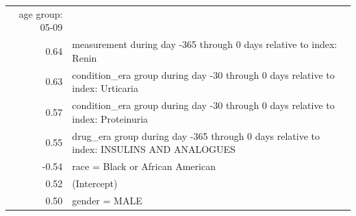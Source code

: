 \documentclass[10.5pt]{book}
\theoremstyle{definition}
\theoremstyle{definition}
\theoremstyle{definition}
\theoremstyle{remark}
\begin{document}
\begin{longtable}[]{@{}rl@{}}
\begin{minipage}[t]{0.87\columnwidth}
age group: 05-09\strut
\end{minipage}\tabularnewline
\begin{minipage}[t]{0.07\columnwidth}\raggedleft\strut
0.64\strut
\end{minipage} & \begin{minipage}[t]{0.87\columnwidth}\raggedright\strut
measurement during day -365 through 0 days relative to index:
Renin\strut
\end{minipage}\tabularnewline
\begin{minipage}[t]{0.07\columnwidth}\raggedleft\strut
0.63\strut
\end{minipage} & \begin{minipage}[t]{0.87\columnwidth}\raggedright\strut
condition\_era group during day -30 through 0 days relative to index:
Urticaria\strut
\end{minipage}\tabularnewline
\begin{minipage}[t]{0.07\columnwidth}\raggedleft\strut
0.57\strut
\end{minipage} & \begin{minipage}[t]{0.87\columnwidth}\raggedright\strut
condition\_era group during day -30 through 0 days relative to index:
Proteinuria\strut
\end{minipage}\tabularnewline
\begin{minipage}[t]{0.07\columnwidth}\raggedleft\strut
0.55\strut
\end{minipage} & \begin{minipage}[t]{0.87\columnwidth}\raggedright\strut
drug\_era group during day -365 through 0 days relative to index:
INSULINS AND ANALOGUES\strut
\end{minipage}\tabularnewline
\begin{minipage}[t]{0.07\columnwidth}\raggedleft\strut
-0.54\strut
\end{minipage} & \begin{minipage}[t]{0.87\columnwidth}\raggedright\strut
race = Black or African American\strut
\end{minipage}\tabularnewline
\begin{minipage}[t]{0.07\columnwidth}\raggedleft\strut
0.52\strut
\end{minipage} & \begin{minipage}[t]{0.87\columnwidth}\raggedright\strut
(Intercept)\strut
\end{minipage}\tabularnewline
\begin{minipage}[t]{0.07\columnwidth}\raggedleft\strut
0.50\strut
\end{minipage} & \begin{minipage}[t]{0.87\columnwidth}\raggedright\strut
gender = MALE\strut
\end{minipage}\tabularnewline
\bottomrule
\end{longtable}
\end{document}

